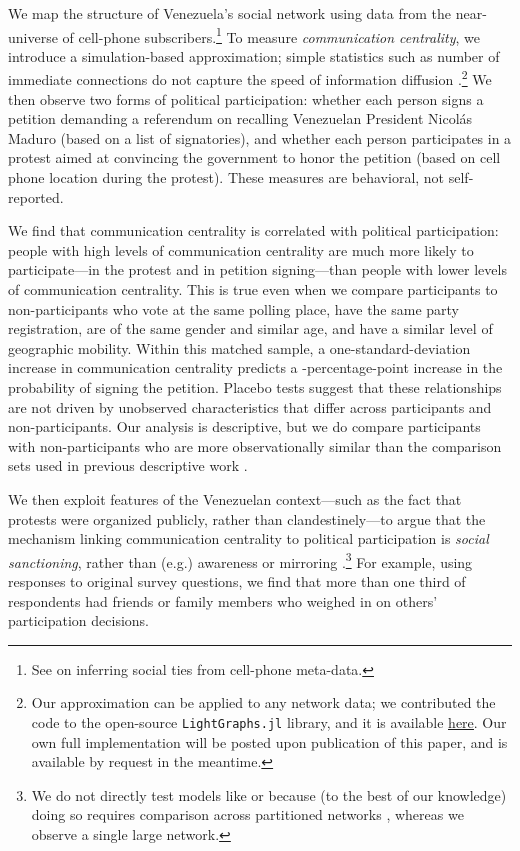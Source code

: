 \documentclass[12pt]{article}
\newcommand{\StepCountInFileNames}{6}
\begin{document}
We map the structure of Venezuela's social network using data from the near-universe of cell-phone subscribers.\footnote{See \citet{EagleEtAl} on inferring social ties from cell-phone meta-data.} To measure \emph{communication centrality}, we introduce a simulation-based approximation; simple statistics such as number of immediate connections do not capture the speed of information diffusion \citep{Newman:2006wv,BanerjeeMicrofinance}.\footnote{Our approximation can be applied to any network data; we contributed the code to the open-source \texttt{LightGraphs.jl} library, and it is available \href{https://github.com/JuliaGraphs/LightGraphs.jl/blob/master/src/traversals/diffusion.jl}{\underline{here}}. Our own full implementation will be posted upon publication of this paper, and is available by request in the meantime.} We then observe two forms of political participation: whether each person signs a petition demanding a referendum on recalling Venezuelan President Nicol\'{a}s Maduro (based on a list of signatories), and whether each person participates in a protest aimed at convincing the government to honor the petition (based on cell phone location during the protest). These measures are behavioral, not self-reported.

%
We find that communication centrality is correlated with political participation: people with high levels of communication centrality are much more likely to participate---in the protest and in petition signing---than people with lower levels of communication centrality. This is true even when we compare participants to non-participants who vote at the same polling place, have the same party registration, are of the same gender and similar age, and have a similar level of geographic mobility. Within this matched sample, a one-standard-deviation increase in communication centrality predicts a \unskip-percentage-point increase in the probability of signing the petition. Placebo tests suggest that these relationships are not driven by unobserved characteristics that differ across participants and non-participants. Our analysis is descriptive, but we do compare participants with non-participants who are more observationally similar than the comparison sets used in previous descriptive work \citep{Larson:2016vk,SteinertThrelkeld:2017dy}.

We then exploit features of the Venezuelan context---such as the fact that protests were organized publicly, rather than clandestinely---to argue that the mechanism linking communication centrality to political participation is \emph{social sanctioning}, rather than (e.g.) awareness \citep{Christensen:2018vd} or mirroring \citep{Siegel:2009vi,Rolfe:2012ka}.\footnote{We do not directly test models like \citet{Rolfe:2012ka} or \citet{Siegel:2009vi} because (to the best of our knowledge) doing so requires comparison across partitioned networks \citep[e.g.][]{Eubank:2018}, whereas we observe a single large network.} For example, using responses to original survey questions, we find that more than one third of respondents had friends or family members who weighed in on others' participation decisions.
\end{document}
